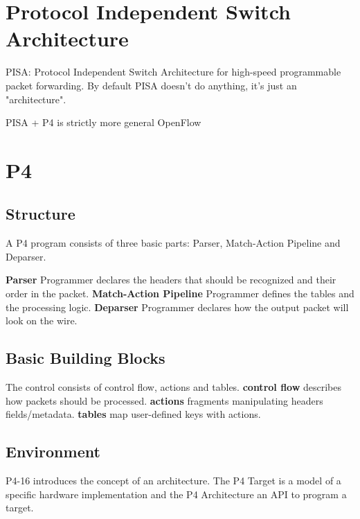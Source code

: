 \documentclass[a4paper, fontsize=8pt, landscape, DIV=1]{scrartcl}
\begin{document}
\begin{multicols*}{4}
  \section{Protocol Independent Switch Architecture}
  PISA: Protocol Independent Switch Architecture for high-speed programmable
  packet forwarding. By default PISA doesn't do anything, it's just an "architecture".

  PISA + P4 is strictly more general OpenFlow

  \section{P4}
  \subsection{Structure}
  A P4 program consists of three basic parts: Parser, Match-Action Pipeline and
  Deparser. 

  \textbf{Parser} Programmer declares the headers that should be recognized and
  their order in the packet. 
  \textbf{Match-Action Pipeline} Programmer defines the tables and the processing
  logic.
  \textbf{Deparser} Programmer declares how the output packet will look on the wire.

  \subsection{Basic Building Blocks}
  The control consists of control flow, actions and tables.
  \textbf{control flow} describes how packets should be processed.
  \textbf{actions} fragments manipulating headers fields/metadata.
  \textbf{tables} map user-defined keys with actions.


  \subsection{Environment}
  P4-16 introduces the concept of an architecture. The P4 Target is a model 
  of a specific hardware implementation and the P4 Architecture an API to
  program a target.


\end{multicols*}
\end{document}
